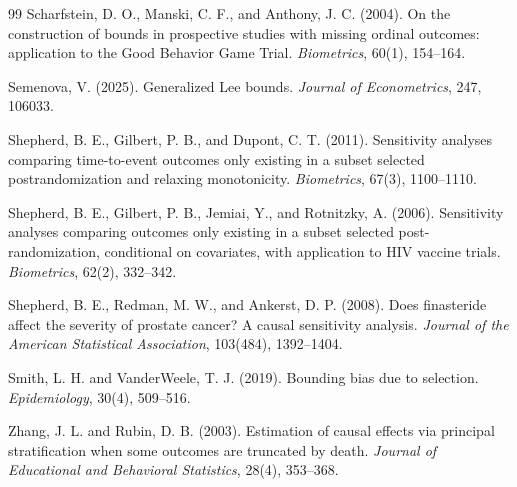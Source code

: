 \documentclass[11pt]{article}
\theoremstyle{definition}
\theoremstyle{plain}
\theoremstyle{remark}
\begin{document}
\begin{thebibliography}{99}
Scharfstein, D. O., Manski, C. F., and Anthony, J. C. (2004).
On the construction of bounds in prospective studies with missing ordinal
outcomes: application to the Good Behavior Game Trial.
\emph{Biometrics}, 60(1), 154--164.

Semenova, V. (2025).
Generalized Lee bounds.
\emph{Journal of Econometrics}, 247, 106033.

Shepherd, B. E., Gilbert, P. B., and Dupont, C. T. (2011).
Sensitivity analyses comparing time-to-event outcomes only existing in a
subset selected postrandomization and relaxing monotonicity.
\emph{Biometrics}, 67(3), 1100--1110.

Shepherd, B. E., Gilbert, P. B., Jemiai, Y., and Rotnitzky, A. (2006).
Sensitivity analyses comparing outcomes only existing in a subset selected
post-randomization, conditional on covariates, with application to HIV vaccine
trials.
\emph{Biometrics}, 62(2), 332--342.

Shepherd, B. E., Redman, M. W., and Ankerst, D. P. (2008).
Does finasteride affect the severity of prostate cancer? A causal sensitivity
analysis.
\emph{Journal of the American Statistical Association}, 103(484), 1392--1404.

Smith, L. H. and VanderWeele, T. J. (2019).
Bounding bias due to selection.
\emph{Epidemiology}, 30(4), 509--516.

Zhang, J. L. and Rubin, D. B. (2003).
Estimation of causal effects via principal stratification when some outcomes
are truncated by death.
\emph{Journal of Educational and Behavioral Statistics}, 28(4), 353--368.
\end{thebibliography}
\end{document}
